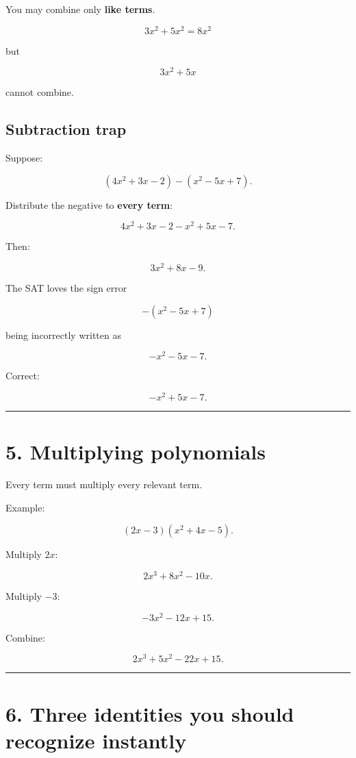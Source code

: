 \documentclass[
]{article}
\begin{document}
You may combine only \textbf{like terms}.

\[
3x^2+5x^2=8x^2
\]

but

\[
3x^2+5x
\]

cannot combine.

\subsection{Subtraction trap}\label{subtraction-trap}

Suppose:

\[
(4x^2+3x-2)-(x^2-5x+7).
\]

Distribute the negative to \textbf{every term}:

\[
4x^2+3x-2-x^2+5x-7.
\]

Then:

\[
3x^2+8x-9.
\]

The SAT loves the sign error

\[
-(x^2-5x+7)
\]

being incorrectly written as

\[
-x^2-5x-7.
\]

Correct:

\[
-x^2+5x-7.
\]

\begin{center}\rule{0.5\linewidth}{0.5pt}\end{center}

\section{5. Multiplying polynomials}\label{multiplying-polynomials}

Every term must multiply every relevant term.

Example:

\[
(2x-3)(x^2+4x-5).
\]

Multiply \(2x\):

\[
2x^3+8x^2-10x.
\]

Multiply \(-3\):

\[
-3x^2-12x+15.
\]

Combine:

\[
\boxed{2x^3+5x^2-22x+15}.
\]

\begin{center}\rule{0.5\linewidth}{0.5pt}\end{center}

\section{6. Three identities you should recognize
instantly}\label{three-identities-you-should-recognize-instantly}
\end{document}
